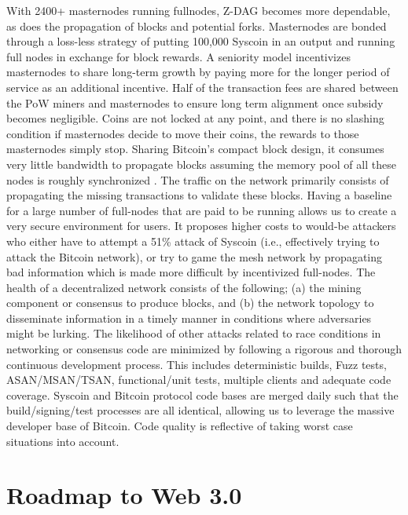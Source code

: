 \documentclass[peerreview]{ieeesyscoin}
\begin{document}
With 2400+ masternodes running fullnodes, Z-DAG becomes more dependable, as does the propagation of blocks and potential forks. Masternodes are bonded through a loss-less strategy of putting 100,000 Syscoin in an output and running full nodes in exchange for block rewards. A seniority model incentivizes masternodes to share long-term growth by paying more for the longer period of service as an additional incentive. Half of the transaction fees are shared between the PoW miners and masternodes to ensure long term alignment once subsidy becomes negligible. Coins are not locked at any point, and there is no slashing condition if masternodes decide to move their coins, the rewards to those masternodes simply stop. Sharing Bitcoin’s compact block design, it consumes very little bandwidth to propagate blocks assuming the memory pool of all these nodes is roughly synchronized \cite{BitCore}. The traffic on the network primarily consists of propagating the missing transactions to validate these blocks. Having a baseline for a large number of full-nodes that are paid to be running allows us to create a very secure environment for users. It proposes higher costs to would-be attackers who either have to attempt a 51\% attack of Syscoin (i.e., effectively trying to attack the Bitcoin network), or try to game the mesh network by propagating bad information which is made more difficult by incentivized full-nodes. The health of a decentralized network consists of the following; (a) the mining component or consensus to produce blocks, and (b) the network topology to disseminate information in a timely manner in conditions where adversaries might be lurking. The likelihood of other attacks related to race conditions in networking or consensus code are minimized by following a rigorous and thorough continuous development process. This includes deterministic builds, Fuzz tests, ASAN/MSAN/TSAN, functional/unit tests, multiple clients and adequate code coverage. Syscoin and Bitcoin protocol code bases are merged daily such that the build/signing/test processes are all identical, allowing us to leverage the massive developer base of Bitcoin.  Code quality is reflective of taking worst case situations into account. 

\section{Roadmap to Web 3.0}
\label{section:roadmap}
\end{document}
